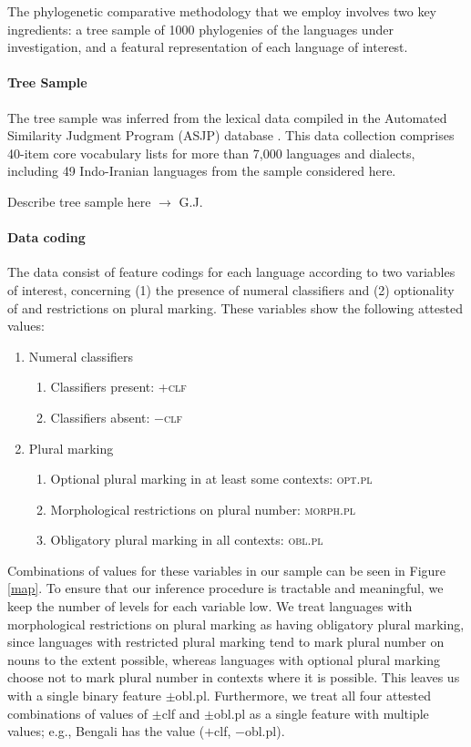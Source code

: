 \documentclass[11pt]{article}
\begin{document}
The phylogenetic comparative methodology that we employ involves two key ingredients: a tree sample of 1000 phylogenies of the languages under investigation, and a featural representation of each language of interest.


\paragraph{Tree Sample}

The tree sample was inferred from the lexical data compiled in the Automated Similarity
Judgment Program (ASJP) database \citep{asjp18}. This data collection comprises 40-item
core vocabulary lists for more than 7,000 languages and dialects, including 49
Indo-Iranian languages from the sample considered here.

{\color{purple}

Describe tree sample here $\rightarrow$ G.J.

}

\paragraph{Data coding}
The data consist of feature codings for each language according to two variables of interest, concerning (1) the presence of numeral classifiers
and
(2) optionality of and restrictions on plural marking.
These variables show the following attested values:
\begin{enumerate}
\item Numeral classifiers
\begin{enumerate}
\item Classifiers present: +\textsc{clf}
\item Classifiers absent: $-$\textsc{clf}
\end{enumerate}
\item Plural marking
\begin{enumerate}
\item Optional plural marking in at least some contexts: \textsc{opt.pl}
\item Morphological restrictions on plural number: \textsc{morph.pl}
\item Obligatory plural marking in all contexts: \textsc{obl.pl}
\end{enumerate}
\end{enumerate}
Combinations of values for these variables in our sample can be seen in Figure \ref{map}.
To ensure that our inference procedure is tractable and meaningful, we keep the number of levels for each variable low. 
We treat languages with morphological restrictions on plural marking as having obligatory plural marking, since languages with restricted plural marking tend to mark plural number on nouns to the extent possible, whereas languages with optional plural marking choose not to mark plural number in contexts where it is possible. This leaves us with a single binary feature {\sc $\pm$obl.pl}. 
Furthermore, we treat all four attested combinations of values of {\sc $\pm$clf} and {\sc $\pm$obl.pl} as a single feature with multiple values; e.g., Bengali has the value {\sc ($+$clf, $-$obl.pl)}.
\end{document}
